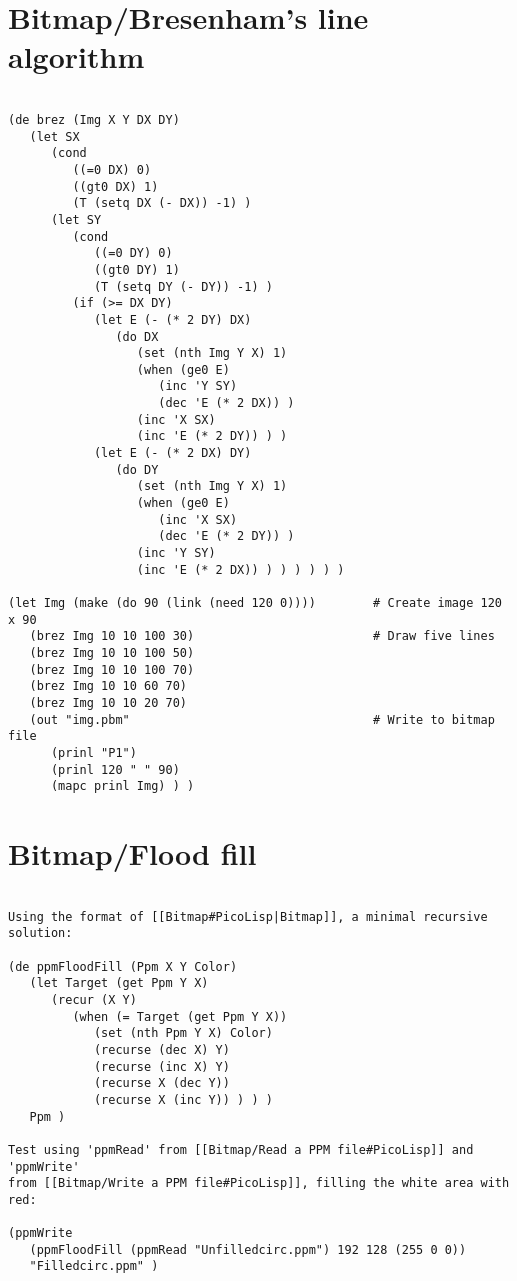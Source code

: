 \section*{Bitmap/Bresenham's line algorithm}

\begin{verbatim}

(de brez (Img X Y DX DY)
   (let SX
      (cond
         ((=0 DX) 0)
         ((gt0 DX) 1)
         (T (setq DX (- DX)) -1) )
      (let SY
         (cond
            ((=0 DY) 0)
            ((gt0 DY) 1)
            (T (setq DY (- DY)) -1) )
         (if (>= DX DY)
            (let E (- (* 2 DY) DX)
               (do DX
                  (set (nth Img Y X) 1)
                  (when (ge0 E)
                     (inc 'Y SY)
                     (dec 'E (* 2 DX)) )
                  (inc 'X SX)
                  (inc 'E (* 2 DY)) ) )
            (let E (- (* 2 DX) DY)
               (do DY
                  (set (nth Img Y X) 1)
                  (when (ge0 E)
                     (inc 'X SX)
                     (dec 'E (* 2 DY)) )
                  (inc 'Y SY)
                  (inc 'E (* 2 DX)) ) ) ) ) ) )

(let Img (make (do 90 (link (need 120 0))))        # Create image 120 x 90
   (brez Img 10 10 100 30)                         # Draw five lines
   (brez Img 10 10 100 50)
   (brez Img 10 10 100 70)
   (brez Img 10 10 60 70)
   (brez Img 10 10 20 70)
   (out "img.pbm"                                  # Write to bitmap file
      (prinl "P1")
      (prinl 120 " " 90)
      (mapc prinl Img) ) )

\end{verbatim}

\section*{Bitmap/Flood fill}

\begin{verbatim}

Using the format of [[Bitmap#PicoLisp|Bitmap]], a minimal recursive solution:

(de ppmFloodFill (Ppm X Y Color)
   (let Target (get Ppm Y X)
      (recur (X Y)
         (when (= Target (get Ppm Y X))
            (set (nth Ppm Y X) Color)
            (recurse (dec X) Y)
            (recurse (inc X) Y)
            (recurse X (dec Y))
            (recurse X (inc Y)) ) ) )
   Ppm )

Test using 'ppmRead' from [[Bitmap/Read a PPM file#PicoLisp]] and 'ppmWrite'
from [[Bitmap/Write a PPM file#PicoLisp]], filling the white area with red:

(ppmWrite
   (ppmFloodFill (ppmRead "Unfilledcirc.ppm") 192 128 (255 0 0))
   "Filledcirc.ppm" )

\end{verbatim}

